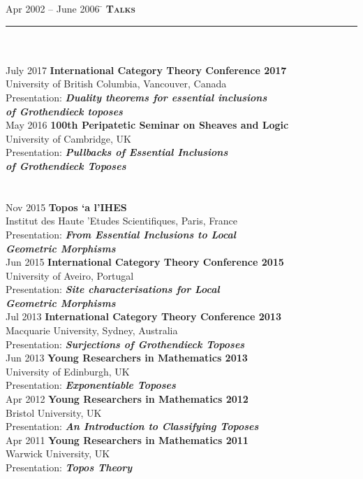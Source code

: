 \documentclass[11pt,a4paper]{article}
\begin{document}
\begin{tabbing}
Apr 2002 -- June 2006 \=\kill
\> \textbf{\Large{\textsc{Talks}}} \\
\> \noindent\rule{11cm}{1pt}\\
\> \\
\> July 2017 \' \textbf{International Category Theory Conference 2017}\\ 
\> University of British Columbia, Vancouver, Canada\\
\> Presentation: \textbf{\textit{Duality theorems for essential inclusions}} \\ \> \textbf{\textit{of Grothendieck toposes}}\\ [1mm] 
\> May 2016 \' \textbf{100th Peripatetic Seminar on Sheaves and Logic } \\
\> University of Cambridge, UK \\
\> Presentation: \textbf{\textit{Pullbacks of Essential Inclusions}} \\ \> \textbf{\textit{of Grothendieck Toposes}} \\[1mm]
\\
\\
\> Nov 2015 \' \textbf{Topos \a`a l'IHES} \\ 
\> Institut des Haute \a'Etudes Scientifiques, Paris, France\\
\> Presentation: \textbf{\textit{From Essential Inclusions to Local}} \\ \> \textbf{\textit{Geometric Morphisms}}\\[1mm]
\> Jun 2015 \' \textbf{International Category Theory Conference 2015}\\ 
\> University of Aveiro, Portugal\\
\> Presentation: \textbf{\textit{Site characterisations for Local}} \\ \> \textbf{\textit{Geometric Morphisms}}\\ [1mm] 
\> Jul 2013 \' \textbf{International Category Theory Conference 2013}\\
\> Macquarie University, Sydney, Australia\\ 
\> Presentation: \textbf{\textit{Surjections of Grothendieck Toposes}}\\ [1mm]
\>Jun 2013 \' \textbf{Young Researchers in Mathematics 2013}\\
\> University of Edinburgh, UK\\
\>Presentation:
 \textbf{\textit{Exponentiable Toposes}}\\[1mm]
\>Apr 2012 \' \textbf{Young Researchers in Mathematics 2012}\\ 
\>Bristol University, UK \\
\>Presentation:
 \textbf{\textit{An Introduction to Classifying Toposes}}\\[1mm]
\> Apr 2011 \' \textbf{Young Researchers in Mathematics 2011}\\ 
\> Warwick University, UK\\
\>Presentation:
 \textbf{\textit{Topos Theory}}\\[1mm]
\end {tabbing}
\end{document}

